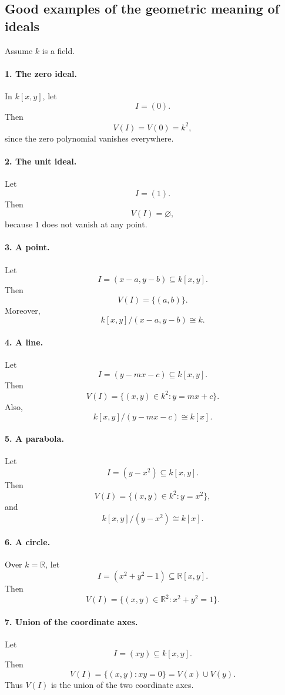 \documentclass[12pt,a4paper]{article}
\theoremstyle{plain}
\theoremstyle{definition}      %
\begin{document}
	
	\subsection*{Good examples of the geometric meaning of ideals}
	
	Assume \(k\) is a field.
	
	\paragraph{1. The zero ideal.}
	In \(k[x,y]\), let
	\[
	I=(0).
	\]
	Then
	\[
	V(I)=V(0)=k^2,
	\]
	since the zero polynomial vanishes everywhere.
	
	\paragraph{2. The unit ideal.}
	Let
	\[
	I=(1).
	\]
	Then
	\[
	V(I)=\varnothing,
	\]
	because \(1\) does not vanish at any point.
	
	\paragraph{3. A point.}
	Let
	\[
	I=(x-a,y-b)\subseteq k[x,y].
	\]
	Then
	\[
	V(I)=\{(a,b)\}.
	\]
	Moreover,
	\[
	k[x,y]/(x-a,y-b)\cong k.
	\]
	
	\paragraph{4. A line.}
	Let
	\[
	I=(y-mx-c)\subseteq k[x,y].
	\]
	Then
	\[
	V(I)=\{(x,y)\in k^2:y=mx+c\}.
	\]
	Also,
	\[
	k[x,y]/(y-mx-c)\cong k[x].
	\]
	
	\paragraph{5. A parabola.}
	Let
	\[
	I=(y-x^2)\subseteq k[x,y].
	\]
	Then
	\[
	V(I)=\{(x,y)\in k^2:y=x^2\},
	\]
	and
	\[
	k[x,y]/(y-x^2)\cong k[x].
	\]
	
	\paragraph{6. A circle.}
	Over \(k=\mathbb R\), let
	\[
	I=(x^2+y^2-1)\subseteq \mathbb R[x,y].
	\]
	Then
	\[
	V(I)=\{(x,y)\in \mathbb R^2:x^2+y^2=1\}.
	\]
	
	\paragraph{7. Union of the coordinate axes.}
	Let
	\[
	I=(xy)\subseteq k[x,y].
	\]
	Then
	\[
	V(I)=\{(x,y):xy=0\}=V(x)\cup V(y).
	\]
	Thus \(V(I)\) is the union of the two coordinate axes.
	
\end{document}
